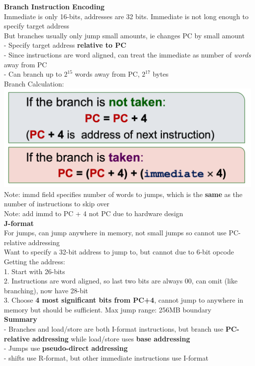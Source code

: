 \documentclass[10pt, a4paper]{article}
\begin{document}
\begin{multicols*}{3}
		\textbf{Branch Instruction Encoding}\\
		Immediate is only 16-bits, addresses are 32 bits. Immediate is not long enough to specify target address\\
		But branches usually only jump small amounts, ie changes PC by small amount\\
		- Specify target address \textbf{relative to PC}\\
		- Since instructions are word aligned, can treat the immediate as number of \textit{words} away from PC\\
		- Can branch up to $2^{15}$ words away from PC, $2^{17}$ bytes\\
		Branch Calculation:\\
		\includegraphics[scale=.25]{./assets/branchCalculation}\\
		Note: immd field specifies number of words to jumps, which is the \textbf{same} as the number of instructions to skip over\\
		Note: add immd to PC + 4 not PC due to hardware design\\
		
		\textbf{J-format}\\
		For jumps, can jump anywhere in memory, not small jumps so cannot use PC-relative addressing\\
		Want to specify a 32-bit address to jump to, but cannot due to 6-bit opcode\\
		Getting the address:\\
		1. Start with 26-bits\\
		2. Instructions are word aligned, so last two bits are always 00, can omit (like branching), now have 28-bit\\
		3. Choose \textbf{4 most significant bits from PC+4}, cannot jump to anywhere in memory but should be sufficient. Max jump range: 256MB boundary\\
		
		\textbf{Summary}\\
		- Branches and load/store are both I-format instructions, but branch use \textbf{PC-relative addressing} while load/store uses \textbf{base addressing}\\
		- Jumps use \textbf{pseudo-direct addressing}\\
		- shifts use R-format, but other immediate instructions use I-format\\
		

\end{multicols*}
\end{document}

